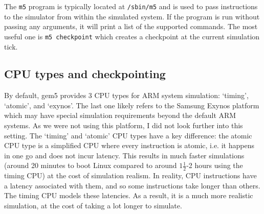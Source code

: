     The \texttt{m5} program is typically located at \texttt{/sbin/m5} and is 
    used to pass instructions to the simulator from within the simulated system.
    If the program is run without passing any arguments, it will print a list of
    the supported commands. The most useful one is \texttt{m5 checkpoint} which
    creates a checkpoint at the current simulation tick.
    
    \subsection{CPU types and checkpointing}
    By default, gem5 provides 3 CPU types for ARM system simulation: `timing',
    `atomic', and `exynos'. The last one likely refers to the Samsung Exynos 
    platform which may have special simulation requirements beyond the default 
    ARM systems. As we were not using this platform, I did not look further 
    into this setting. The `timing' and `atomic' CPU types have a key 
    difference: the atomic CPU type is a simplified CPU where every instruction 
    is atomic, i.e. it happens in one go and does not incur latency. This 
    results in much faster simulations (around 20 minutes to boot Linux 
    compared to around $1\frac{1}{2}$-2 hours using the timing CPU) at the cost 
    of 
    simulation realism. In reality, CPU instructions have a latency associated 
    with them, and so some instructions take longer than others. The timing CPU 
    models these latencies. As a result, it is a much more realistic simulation,
    at the cost of taking a lot longer to simulate.
    
